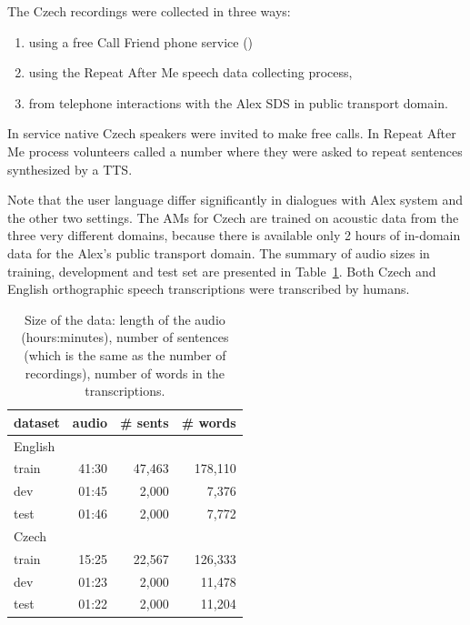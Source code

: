 The Czech recordings were collected in three ways\cite{korvas_2014}:
\begin{enumerate}
    \item using a free Call Friend phone service ()
    \item using the Repeat After Me speech data collecting process,
    \item from telephone interactions with the Alex \ac{SDS} in public transport domain.
\end{enumerate}

In  service native Czech speakers were invited to make free calls.
In Repeat After Me process volunteers called a number where they were asked to repeat 
sentences synthesized by a \ac{TTS}.

Note that the user language differ significantly in dialogues with Alex system and the other two settings.
The \acp{AM} for Czech are trained on acoustic data from the three very different domains, because there is available only 2 hours of in-domain data for the Alex's public transport domain.
The summary of audio sizes in training, development and test set are presented in Table~\ref{tab:audio}.
Both Czech and English orthographic speech transcriptions were transcribed by humans.

\begin{table}[hbp]
    \centering
    \begin{tabular}{lrrr}
        \hline
            dataset & audio & \# sents & \# words \\
        \hline
            English & & & \\
                train & 41:30 & 47,463 & 178,110 \\
                dev & 01:45 & 2,000 & 7,376 \\
                test & 01:46 & 2,000 & 7,772 \\
        \hline
            Czech & & & \\
                train & 15:25 & 22,567 & 126,333 \\
                dev & 01:23 & 2,000 & 11,478 \\
                test & 01:22 & 2,000 & 11,204 \\
        \hline
		\end{tabular}
    \caption{Size of the data: length of the audio (hours:minutes), number of sentences
        (which is the same as the number of recordings), number of words in the 
    transcriptions.\cite{korvas_2014}}
    \label{tab:audio}
\end{table}


